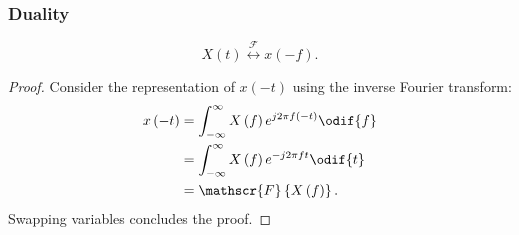 \documentclass{article}
\begin{document}
\subsubsection{Duality}
\begin{equation*}
    X\left( t \right) \overset{\mathscr{F}}{\longleftrightarrow} x\left( -f \right).
\end{equation*}
\begin{proof}
    Consider the representation of \(x\left( -t \right)\) using the inverse Fourier transform:
    \begin{align*}
        x\left( -t \right) & = \int_{-\infty}^\infty X\left( f \right) e^{j 2\pi f \left( -t \right)} \odif{f} \\
                           & = \int_{-\infty}^\infty X\left( f \right) e^{-j 2\pi f t} \odif{t}                \\
                           & = \mathscr{F}\left\{ X\left( f \right) \right\}.
    \end{align*}
    Swapping variables concludes the proof.
\end{proof}
\end{document}
